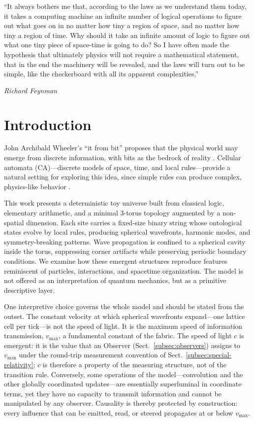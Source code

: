 \documentclass{ijuc}
\begin{document}
\newpage


\epigraph{``It always bothers me that, according to the laws as we understand them today, it takes a computing machine an infinite number of logical operations to figure out what goes on in no matter how tiny a region of space, and no matter how tiny a region of time. Why should it take an infinite amount of logic to figure out what one tiny piece of space-time is going to do? So I have often made the hypothesis that ultimately physics will not require a mathematical statement, that in the end the machinery will be revealed, and the laws will turn out to be simple, like the checkerboard with all its apparent complexities.''}{\textit{Richard Feynman}}

\section{Introduction}

John Archibald Wheeler's ``it from bit'' proposes that the physical world may emerge from discrete information, with bits as the bedrock of reality \cite{wheeler}. Cellular automata (CA)---discrete models of space, time, and local rules---provide a natural setting for exploring this idea, since simple rules can produce complex, physics-like behavior \cite{wolfram,zuse,fredkin}.

This work presents a deterministic toy universe built from classical logic, elementary arithmetic, and a minimal 3-torus topology augmented by a non-spatial dimension. Each site carries a fixed-size binary string whose ontological states evolve by local rules, producing spherical wavefronts, harmonic modes, and symmetry-breaking patterns. Wave propagation is confined to a spherical cavity inside the torus, suppressing corner artifacts while preserving periodic boundary conditions. We examine how these emergent structures reproduce features reminiscent of particles, interactions, and spacetime organization. The model is not offered as an interpretation of quantum mechanics, but as a primitive descriptive layer.

One interpretive choice governs the whole model and should be stated from the outset. The constant velocity at which spherical wavefronts expand---one lattice cell per tick---is not the speed of light. It is the maximum speed of information transmission, $v_{\max}$, a fundamental constant of the fabric. The speed of light $c$ is emergent: it is the value that an Observer (Sect.~\ref{subsec:observers}) assigns to $v_{\max}$ under the round-trip measurement convention of Sect.~\ref{subsec:special-relativity}; $c$ is therefore a property of the measuring structure, not of the transition rule. Conversely, some operations of the model---convolution and the other globally coordinated updates---are essentially superluminal in coordinate terms, yet they have no capacity to transmit information and cannot be manipulated by any observer. Causality is thereby protected by construction: every influence that can be emitted, read, or steered propagates at or below $v_{\max}$.
\end{document}
